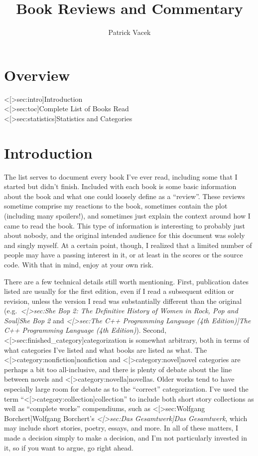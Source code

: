 \documentclass[12pt]{article}
\title{Book Reviews and Commentary}
\author{Patrick Vacek}
\def\hyperref#1{<#1>} %
\begin{document}
\maketitle

\section*{Overview}
\hyperref[sec:intro]{Introduction} \dotfill \pageref{sec:intro}
\\\indent\hyperref[sec:toc]{Complete List of Books Read} \dotfill \pageref{sec:toc}
\\\indent\hyperref[sec:statistics]{Statistics and Categories} \dotfill \pageref{sec:statistics}


\section*{Introduction} \label{sec:intro}

The list serves to document every book I've ever read, including some that I started but didn't finish. Included with each book is some basic information about the book and what one could loosely define as a ``review''. These reviews sometime comprise my reactions to the book, sometimes contain the plot (including many spoilers!), and sometimes just explain the context around how I came to read the book. This type of information is interesting to probably just about nobody, and the original intended audience for this document was solely and singly myself. At a certain point, though, I realized that a limited number of people may have a passing interest in it, or at least in the scores or the source code. With that in mind, enjoy at your own risk.

There are a few technical details still worth mentioning. First, publication dates listed are usually for the first edition, even if I read a subsequent edition or revision, unless the version I read was substantially different than the original (e.g.\ \textit{\hyperref[sec:She Bop 2: The Definitive History of Women in Rock, Pop and Soul]{She Bop 2}} and \textit{\hyperref[sec:The C++ Programming Language (4th Edition)]{The C++ Programming Language (4th Edition)}}). Second, \hyperref[sec:finished_category]{categorization} is somewhat arbitrary, both in terms of what categories I've listed and what books are listed as what. The \hyperref[category:nonfiction]{nonfiction} and \hyperref[category:novel]{novel} categories are perhaps a bit too all-inclusive, and there is plenty of debate about the line between novels and \hyperref[category:novella]{novellas}. Older works tend to have especially large room for debate as to the ``correct'' categorization. I've used the term ``\hyperref[category:collection]{collection}'' to include both short story collections as well as ``complete works'' compendiums, such as \hyperref[sec:Wolfgang Borchert]{Wolfgang Borchert}'s \textit{\hyperref[sec:Das Gesamtwerk]{Das Gesamtwerk}}, which may include short stories, poetry, essays, and more. In all of these matters, I made a decision simply to make a decision, and I'm not particularly invested in it, so if you want to argue, go right ahead.
\end{document}
